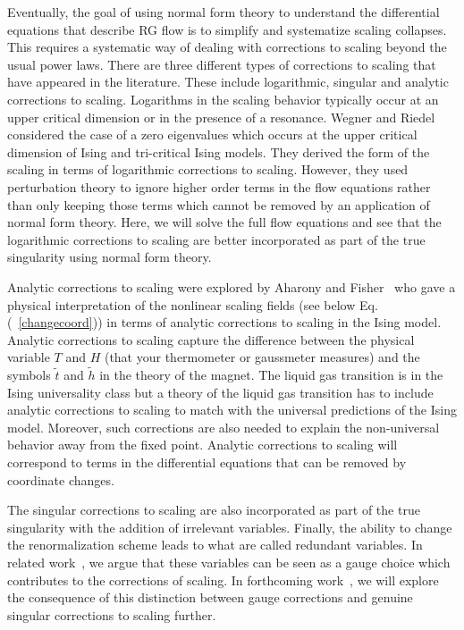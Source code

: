 \documentclass[
 reprint,
 amsmath,amssymb,
 aps, superscriptaddress, pre
]{revtex4-1}
\begin{document}
Eventually, the goal of using normal form theory to understand the differential equations that describe RG flow is to simplify and systematize scaling collapses. This requires a systematic way of dealing with corrections to scaling beyond the usual power laws. There are three different types of corrections to scaling that have appeared in the literature. These include logarithmic, singular and analytic corrections to scaling. Logarithms in the scaling behavior typically occur at an upper critical dimension or in the presence of a resonance. Wegner and Riedel~\cite{Wegner73} considered the case of a zero eigenvalues which occurs at the upper critical dimension of Ising and tri-critical Ising models. They derived the form of the scaling in terms of logarithmic corrections to scaling. However, they used perturbation theory to ignore higher order terms in the flow equations rather than only keeping those terms which cannot be removed by an application of normal form theory. Here, we will solve the full flow equations and see that the logarithmic corrections to scaling are better incorporated as part of the true singularity using normal form theory.

Analytic corrections to scaling were explored by Aharony and Fisher~\cite{aharony1983nonlinear} who gave a physical interpretation of the nonlinear scaling fields (see below Eq.(~\ref{changecoord})) in terms of analytic corrections to scaling in the Ising model. Analytic corrections to scaling capture the difference between the physical variable $T$ and $H$ (that your thermometer or gaussmeter measures) and the symbols $\tilde{t}$ and $\tilde{h}$ in the theory of the magnet. The liquid gas transition is in the Ising universality class but a theory of the liquid gas transition has to include analytic corrections to scaling to match with the universal predictions of the Ising model. Moreover, such corrections are also needed to explain the non-universal behavior away from the fixed point. Analytic corrections to scaling will correspond to terms in the differential equations that can be removed by coordinate changes.

The singular corrections to scaling are also incorporated as part of the true singularity with the addition of irrelevant variables.  Finally, the ability to change the renormalization scheme leads to what are called redundant variables. In related work~\cite{raju2018reexamining}, we argue that these variables can be seen as a gauge choice which contributes to the corrections of scaling. In forthcoming work~\cite{Clement18}, we will explore the consequence of this distinction between gauge corrections and genuine singular corrections to scaling further.
\end{document}
